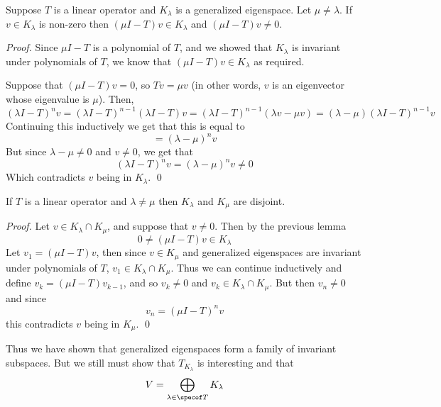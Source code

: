 \begin{lemm*}

    Suppose $T$ is a linear operator and $K_\lambda$ is a generalized eigenspace.
    Let $\mu\neq\lambda$.
    If $v\in K_\lambda$ is non-zero then $(\mu I-T)v\in K_\lambda$ and $(\mu I-T)v\neq0$.

\end{lemm*}

\begin{proof}

    Since $\mu I-T$ is a polynomial of $T$, and we showed that $K_\lambda$ is invariant under polynomials of $T$, we know that $(\mu I-T)v\in K_\lambda$ as required.

    Suppose that $(\mu I-T)v=0$, so $Tv=\mu v$ (in other words, $v$ is an eigenvector whose eigenvalue is $\mu$).
    Then,
    \[ (\lambda I-T)^nv = (\lambda I-T)^{n-1}(\lambda I-T)v = (\lambda I-T)^{n-1}(\lambda v-\mu v) = (\lambda-\mu)(\lambda I-T)^{n-1}v \]
    Continuing this inductively we get that this is equal to
    \[ = (\lambda-\mu)^nv \]
    But since $\lambda-\mu\neq0$ and $v\neq0$, we get that
    \[ (\lambda I-T)^nv = (\lambda-\mu)^nv \neq 0 \]
    Which contradicts $v$ being in $K_\lambda$.
    \qed

\end{proof}

\begin{prop*}

    If $T$ is a linear operator and $\lambda\neq\mu$ then $K_\lambda$ and $K_\mu$ are disjoint.

\end{prop*}

\begin{proof}

    Let $v\in K_\lambda\cap K_\mu$, and suppose that $v\neq0$.
    Then by the previous lemma
    \[ 0\neq(\mu I-T)v \in K_\lambda \]
    Let $v_1=(\mu I-T)v$, then since $v\in K_\mu$ and generalized eigenspaces are invariant under polynomials of $T$, $v_1\in K_\lambda\cap K_\mu$.
    Thus we can continue inductively and define $v_k=(\mu I-T)v_{k-1}$, and so $v_k\neq0$ and $v_k\in K_\lambda\cap K_\mu$.
    But then $v_n\neq0$ and since
    \[ v_n = (\mu I-T)^nv \]
    this contradicts $v$ being in $K_\mu$.
    \qed

\end{proof}

Thus we have shown that generalized eigenspaces form a family of invariant subspaces.
But we still must show that $T_{K_\lambda}$ is interesting and that
\[ V = \bigoplus_{\lambda\in\specof T}K_\lambda \]

